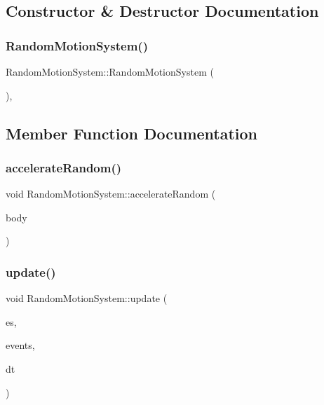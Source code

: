 \subsection{Constructor \& Destructor Documentation}
\mbox{\label{classRandomMotionSystem_aef7a690b419355d36b52ec14d549fab2}} 
\subsubsection{\texorpdfstring{Random\+Motion\+System()}{RandomMotionSystem()}}
{\footnotesize\ttfamily Random\+Motion\+System\+::\+Random\+Motion\+System (\begin{DoxyParamCaption}{ }\end{DoxyParamCaption})\hspace{0.3cm}{\ttfamily [inline]}, {\ttfamily [explicit]}}



\subsection{Member Function Documentation}
\mbox{\label{classRandomMotionSystem_a001b0eb8bce4321e0e3fbb14b3ba88a1}} 
\subsubsection{\texorpdfstring{accelerate\+Random()}{accelerateRandom()}}
{\footnotesize\ttfamily void Random\+Motion\+System\+::accelerate\+Random (\begin{DoxyParamCaption}\item[{\hyperlink{structBody}{Body} \&}]{body }\end{DoxyParamCaption})}

\mbox{\label{classRandomMotionSystem_af76eacfa2fbd4209ec02d77f8ef893d2}} 
\subsubsection{\texorpdfstring{update()}{update()}}
{\footnotesize\ttfamily void Random\+Motion\+System\+::update (\begin{DoxyParamCaption}\item[{ex\+::\+Entity\+Manager \&}]{es,  }\item[{ex\+::\+Event\+Manager \&}]{events,  }\item[{ex\+::\+Time\+Delta}]{dt }\end{DoxyParamCaption})\hspace{0.3cm}{\ttfamily [override]}}



